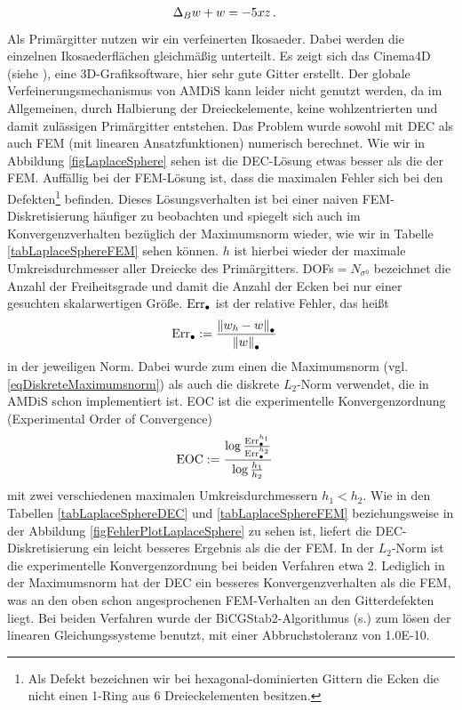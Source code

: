 \begin{beispiel}[Einheitssphäre]
\begin{align}
          \label{eqLaplaceSphereProblemUmform}
         \Delta_{B} w + w &= -5 x z \,\text{.}
       \end{align}
       Als Primärgitter nutzen wir ein verfeinerten Ikosaeder.
       Dabei werden die einzelnen Ikosaederflächen gleichmäßig unterteilt.
       Es zeigt sich das Cinema4D (siehe \cite{cinema4d}), eine 3D-Grafiksoftware, hier sehr gute Gitter erstellt.
       Der globale Verfeinerungsmechanismus von AMDiS kann leider nicht genutzt werden, da im Allgemeinen,
       durch Halbierung der Dreieckelemente, keine wohlzentrierten und damit zulässigen Primärgitter entstehen.
       Das Problem wurde sowohl mit DEC als auch FEM (mit linearen Ansatzfunktionen) 
       numerisch berechnet.
       Wie wir in Abbildung \ref{figLaplaceSphere} sehen ist die DEC-Lösung etwas besser als die der FEM.
       Auffällig bei der FEM-Lösung ist, dass die maximalen Fehler sich bei den Defekten\footnote{Als Defekt bezeichnen wir bei
       hexagonal-dominierten Gittern die Ecken die nicht einen 1-Ring aus 6 Dreieckelementen besitzen.} 
       befinden.
       Dieses Lösungsverhalten ist bei einer naiven FEM-Diskretisierung häufiger zu beobachten und spiegelt sich auch im
       Konvergenzverhalten bezüglich der Maximumsnorm wieder, wie wir in Tabelle \ref{tabLaplaceSphereFEM} sehen können.
       \( h \) ist hierbei wieder der maximale Umkreisdurchmesser aller Dreiecke des Primärgitters.
       DOFs\( = N_{\sigma^{0}} \) bezeichnet die Anzahl der Freiheitsgrade und damit die Anzahl der Ecken
       bei nur einer gesuchten skalarwertigen Größe.
       \( \text{Err}_{\bullet} \) ist der relative Fehler, das heißt
       \begin{align}
         \text{Err}_{\bullet} &:= \frac{\left\| w_{h} - w \right\|_{\bullet}}{\left\| w \right\|_{\bullet}}
       \end{align}
       in der jeweiligen Norm.
       Dabei wurde zum einen die Maximumsnorm (vgl. \ref{eqDiskreteMaximumsnorm}) als auch die diskrete \(
       L_{2} \)-Norm verwendet,
       die in AMDiS schon implementiert ist.
       EOC ist die experimentelle Konvergenzordnung (Experimental Order of Convergence)
       \begin{align}
         \text{EOC} &:= \frac{\log\frac{\text{Err}_{\bullet}^{h_{1}}}{\text{Err}_{\bullet}^{h_{2}}}}
                             {\log\frac{h_{1}}{h_{2}}}
       \end{align}
       mit zwei verschiedenen maximalen Umkreisdurchmessern \( h_{1} < h_{2} \).
       Wie in den Tabellen \ref{tabLaplaceSphereDEC} und \ref{tabLaplaceSphereFEM} beziehungsweise in der
       Abbildung \ref{figFehlerPlotLaplaceSphere} zu sehen ist, liefert die DEC-Diskretisierung ein leicht
       besseres Ergebnis als die der FEM.
       In der \( L_{2} \)-Norm ist die experimentelle Konvergenzordnung bei beiden Verfahren etwa 2.
       Lediglich in der Maximumsnorm hat der DEC ein besseres Konvergenzverhalten als die FEM, 
       was an den oben schon
       angesprochenen FEM-Verhalten an den Gitterdefekten liegt.
       Bei beiden Verfahren wurde der BiCGStab2-Algorithmus (s.\cite{bicgstab2}) zum lösen der linearen
       Gleichungssysteme benutzt, mit einer Abbruchstoleranz von 1.0E-10.


\end{beispiel}

